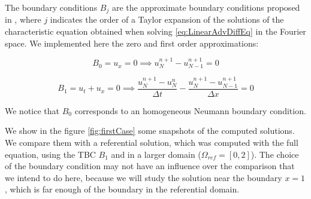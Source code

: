 \indent The boundary conditions $B_j$ are the approximate boundary conditions proposed in \cite{halpern1986}, where $j$ indicates the order of a Taylor expansion of the solutions of the characteristic equation obtained when solving  \ref{eq:LinearAdvDiffEq} in the Fourier space. We implemented here the zero and first order approximations:

\begin{equation}
	B_0 = u_x = 0 \implies u_N^{n+1} - u_{N-1}^{n+1} = 0
\end{equation}

\begin{equation}
	B_1 = u_t + u_x = 0 \implies \frac{u_N^{n+1} - u_N^{n}}{\Delta t} - \frac{u_N^{n+1} - u_{N-1}^{n+1}}{\Delta x} = 0
\end{equation}

\indent We notice that $B_0$ corresponds to an homogeneous Neumann boundary condition.

\indent We show in the figure \ref{fig:firstCase} some snapshots of the computed solutions. We compare them with a referential solution, which was computed with the full equation, using the TBC $B_1$ and in a larger domain ($\Omega_{ref} = [0,2]$). The choice of the boundary condition may not have an influence over the comparison that we intend to do here, because we will study the solution near the boundary $x=1$, which is far enough of the boundary in the referential domain.

